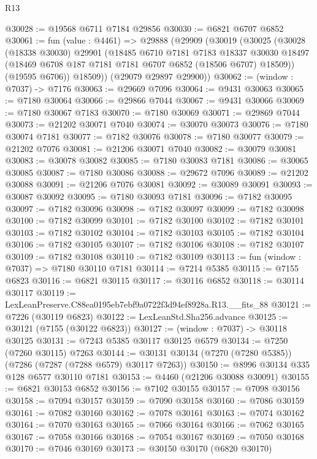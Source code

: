 \begin{lexlean}{R13}
\begin{coremodule}
@30028 := @19568 @6711 @7184 @29856
@30030 := @6821 @6707 @6852
@30061 := fun (value : @4461) =>
  @29888
    (@29909
      (@30019
        (@30025
          (@30028
            (@18338 @30030)
            @29901
            (@18485
              @6710
              @7181
              @7183
              @18337
              @30030
              @18497
              (@18469 @6708 @187 @7181 @7181 @6707 @6852 (@18506 @6707) @18509))
            (@19595 @6706))
          @18509))
      (@29079 @29897 @29900))
@30062 := (window : @7037) -> @7176
@30063 := @29669 @7096
@30064 := @9431 @30063
@30065 := @7180 @30064
@30066 := @29866 @7044
@30067 := @9431 @30066
@30069 := @7180 @30067 @7183
@30070 := @7180 @30069
@30071 := @29869 @7044
@30073 := @21202 @30071 @7040
@30074 := @30070 @30073
@30076 := @7180 @30074 @7181
@30077 := @7182 @30076
@30078 := @7180 @30077
@30079 := @21202 @7076
@30081 := @21206 @30071 @7040
@30082 := @30079 @30081
@30083 := @30078 @30082
@30085 := @7180 @30083 @7181
@30086 := @30065 @30085
@30087 := @7180 @30086
@30088 := @29672 @7096
@30089 := @21202 @30088
@30091 := @21206 @7076 @30081
@30092 := @30089 @30091
@30093 := @30087 @30092
@30095 := @7180 @30093 @7181
@30096 := @7182 @30095
@30097 := @7182 @30096
@30098 := @7182 @30097
@30099 := @7182 @30098
@30100 := @7182 @30099
@30101 := @7182 @30100
@30102 := @7182 @30101
@30103 := @7182 @30102
@30104 := @7182 @30103
@30105 := @7182 @30104
@30106 := @7182 @30105
@30107 := @7182 @30106
@30108 := @7182 @30107
@30109 := @7182 @30108
@30110 := @7182 @30109
@30113 := fun (window : @7037) => @7180 @30110 @7181
@30114 := @7214 @5385
@30115 := @7155 @6823
@30116 := @6821 @30115
@30117 := @30116 @6852
@30118 := @30114 @30117
@30119 := LexLeanPreserve.C88ea0195eb7ebf9a0722f3d94ef8928a.R13.__fits_88
@30121 := @7226 (@30119 @6823)
@30122 := LexLeanStd.Sha256.advance
@30125 := @30121 (@7155 (@30122 @6823))
@30127 := (window : @7037) -> @30118 @30125
@30131 := @7243 @5385 @30117 @30125 @6579
@30134 := @7250 (@7260 @30115) @7263
@30144 := @30131 @30134 (@7270 (@7280 @5385)) (@7286 (@7287 (@7288 @6579) @30117 @7263))
@30150 := @8996 @30134 @335 @128 @6577 @30110 @7181
@30153 := @4460 (@21206 @30088 @30091)
@30155 := @6821 @30153 @6852
@30156 := @7102 @30155
@30157 := @7098 @30156
@30158 := @7094 @30157
@30159 := @7090 @30158
@30160 := @7086 @30159
@30161 := @7082 @30160
@30162 := @7078 @30161
@30163 := @7074 @30162
@30164 := @7070 @30163
@30165 := @7066 @30164
@30166 := @7062 @30165
@30167 := @7058 @30166
@30168 := @7054 @30167
@30169 := @7050 @30168
@30170 := @7046 @30169
@30173 := @30150 @30170 (@6820 @30170)

\end{coremodule}
\end{lexlean}

